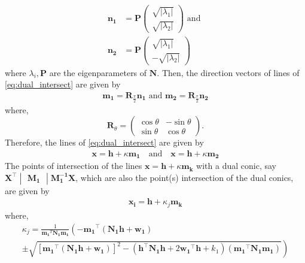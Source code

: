 \documentclass[journal,12pt,twocolumn]{IEEEtran}
\let\vec\mathbf
\newcommand{\myvec}[1]{\ensuremath{\begin{pmatrix}#1\end{pmatrix}}}
\newcommand{\mydet}[1]{\ensuremath{\begin{vmatrix}#1\end{vmatrix}}}
\providecommand{\brak}[1]{\ensuremath{\left(#1\right)}}
\providecommand{\abs}[1]{\left\vert#1\right\vert}
\providecommand{\lbrak}[1]{\ensuremath{\left(#1\right.}}
\providecommand{\rbrak}[1]{\ensuremath{\left.#1\right)}}
\providecommand{\sbrak}[1]{\ensuremath{{}\left[#1\right]}}
\begin{document}
\begin{align}
		\vec{n_1} &= \vec{P}\myvec{\sqrt{\abs{\lambda_1}}\\ \sqrt{\abs{\lambda_2}}} \text{ and } \\
		\vec{n_2} &= \vec{P}\myvec{\sqrt{\abs{\lambda_1}}\\ -\sqrt{\abs{\lambda_2}}}
\end{align}
where $\lambda_i, \vec{P}$ are the eigenparameters of $\vec{N}$. Then, the direction vectors of lines of \eqref{eq:dual_intersect} are given by
\begin{gather}
		\vec{m_1} = \vec{R}_{\frac{\pi}{2}}\vec{n_1} \text{ and } \vec{m_2} = \vec{R}_{\frac{\pi}{2}}\vec{n_2}
\end{gather}
where, \[ \vec{R}_{\theta} = \myvec{\cos  \theta & -\sin \theta \\ \sin \theta & \cos \theta} \text{.} \]
Therefore, the lines of \eqref{eq:dual_intersect} are given by
\begin{align}
		\vec{x} = \vec{h} + \kappa\vec{m_1} \quad \text{and} \quad
		\vec{x} = \vec{h} + \kappa\vec{m_2} 
\end{align}
\newpage
The points of intersection of the lines $\vec{x} = \vec{h} + \kappa\vec{m_k}$ with a dual conic, say $\vec{X}^{\top}\mydet{\vec{M_1}}\vec{M_1^{-1}}\vec{X}$, which are also the point(s) intersection of the dual conics, are given by
\begin{align}
		\vec{x_i} = \vec{h} + \kappa_j\vec{m_k}
\end{align}
where,
{\tiny
\begin{multline}
\kappa_j = \frac{1}
{
\vec{m_1}^T\vec{N_1}\vec{m_1}
}
\lbrak{-\vec{m_1}^{\top}\brak{\vec{N_1}\vec{h}+\vec{w_1}}}
\\[0.5ex]
\pm
\rbrak{\sqrt{
\sbrak{
\vec{m_1}^{\top}\brak{\vec{N_1}\vec{h}+\vec{w_1}}
}^2
-
\brak
{
\vec{h}^{\top}\vec{N_1}\vec{h} + 2\vec{w_1}^{\top}\vec{h} +k_1
}
\brak{\vec{m_1}^{\top}\vec{N_1}\vec{m_1}}
}
}
\end{multline}
}
\vspace{-0.5cm}
\end{document}

